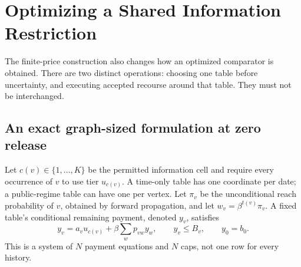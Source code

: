 \section{Optimizing a Shared Information Restriction}\label{sec:shared-new}
The finite-price construction also changes how an optimized comparator is obtained. There are two distinct operations: choosing one table before uncertainty, and executing accepted recourse around that table. They must not be interchanged.

\subsection{An exact graph-sized formulation at zero release}
Let $c(v)\in\{1,\ldots,K\}$ be the permitted information cell and require every occurrence of $v$ to use tier $u_{c(v)}$. A time-only table has one coordinate per date; a public-regime table can have one per vertex. Let $\pi_v$ be the unconditional reach probability of $v$, obtained by forward propagation, and let $w_v=\beta^{t(v)}\pi_v$. A fixed table's conditional remaining payment, denoted $y_v$, satisfies
\begin{equation}\label{eq:table-condensed}
 y_v=a_vu_{c(v)}+\beta\sum_wp_{vw}y_w,
 \qquad y_v\leq B_v,\qquad y_0=b_0.
\end{equation}
This is a system of $N$ payment equations and $N$ caps, not one row for every history.

